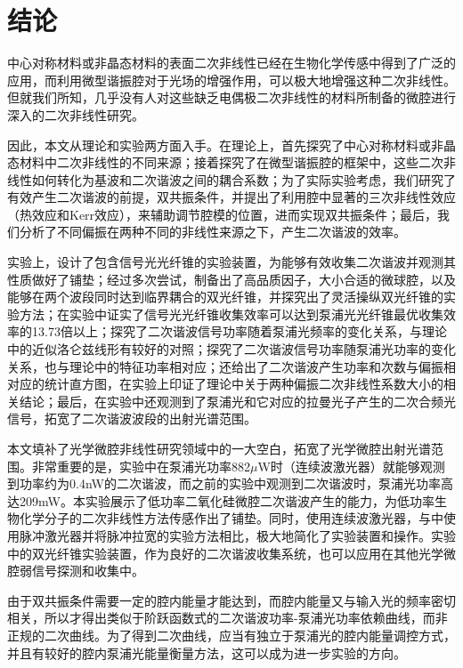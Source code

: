 \chapter{结论}
\label{sec:conclu}

中心对称材料或非晶态材料的表面二次非线性已经在生物化学传感中得到了广泛的应用，而利用微型谐振腔对于光场的增强作用，可以极大地增强这种二次非线性。但就我们所知，几乎没有人对这些缺乏电偶极二次非线性的材料所制备的微腔进行深入的二次非线性研究。

因此，本文从理论和实验两方面入手。在理论上，首先探究了中心对称材料或非晶态材料中二次非线性的不同来源；接着探究了在微型谐振腔的框架中，这些二次非线性如何转化为基波和二次谐波之间的耦合系数；为了实际实验考虑，我们研究了有效产生二次谐波的前提，双共振条件，并提出了利用腔中显著的三次非线性效应（热效应和Kerr效应），来辅助调节腔模的位置，进而实现双共振条件；最后，我们分析了不同偏振在两种不同的非线性来源之下，产生二次谐波的效率。

实验上，设计了包含信号光光纤锥的实验装置，为能够有效收集二次谐波并观测其性质做好了铺垫；经过多次尝试，制备出了高品质因子，大小合适的微球腔，以及能够在两个波段同时达到临界耦合的双光纤锥，并探究出了灵活操纵双光纤锥的实验方法；在实验中证实了信号光光纤锥收集效率可以达到泵浦光光纤锥最优收集效率的13.73倍以上；探究了二次谐波信号功率随着泵浦光频率的变化关系，与理论中的近似洛仑兹线形有较好的对照；探究了二次谐波信号功率随泵浦光功率的变化关系，也与理论中的特征功率相对应；还给出了二次谐波产生功率和次数与偏振相对应的统计直方图，在实验上印证了理论中关于两种偏振二次非线性系数大小的相关结论；最后，在实验中还观测到了泵浦光和它对应的拉曼光子产生的二次合频光信号，拓宽了二次谐波波段的出射光谱范围。

本文填补了光学微腔非线性研究领域中的一大空白，拓宽了光学微腔出射光谱范围。非常重要的是，实验中在泵浦光功率882$\mu$W时（连续波激光器）就能够观测到功率约为0.4nW的二次谐波，而之前的实验中观测到二次谐波时，泵浦光功率高达209mW\cite{asano2016visible}。本实验展示了低功率二氧化硅微腔二次谐波产生的能力，为低功率生物化学分子的二次非线性方法传感作出了铺垫。同时，使用连续波激光器，与\cite{dominguez2011whispering}中使用脉冲激光器并将脉冲拉宽的实验方法相比，极大地简化了实验装置和操作。实验中的双光纤锥实验装置，作为良好的二次谐波收集系统，也可以应用在其他光学微腔弱信号探测和收集中。

由于双共振条件需要一定的腔内能量才能达到，而腔内能量又与输入光的频率密切相关，所以才得出类似于阶跃函数式的二次谐波功率-泵浦光功率依赖曲线，而非正规的二次曲线。为了得到二次曲线，应当有独立于泵浦光的腔内能量调控方式，并且有较好的腔内泵浦光能量衡量方法，这可以成为进一步实验的方向。